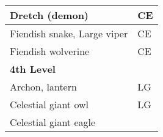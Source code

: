 \begin{longtable}{llll}
\multicolumn{1}{|p{3.326in}|}{\begin{minipage}[t]{3.326in}\raggedright
Dretch (demon)\end{minipage}} & \multicolumn{3}{p{0.601in}|}{\begin{minipage}[t]{0.601in}\raggedright
CE\end{minipage}}\\
\hline
\multicolumn{1}{|p{3.326in}|}{\begin{minipage}[t]{3.326in}\raggedright
Fiendish snake, Large viper\end{minipage}} & \multicolumn{3}{p{0.601in}|}{\begin{minipage}[t]{0.601in}\raggedright
CE\end{minipage}}\\
\hline
\multicolumn{1}{|p{3.326in}|}{\begin{minipage}[t]{3.326in}\raggedright
Fiendish wolverine\end{minipage}} & \multicolumn{3}{p{0.601in}|}{\begin{minipage}[t]{0.601in}\raggedright
CE\end{minipage}}\\
\hline
\multicolumn{1}{|p{3.326in}|}{\begin{minipage}[t]{3.326in}\raggedright
\textbf{4th Level}\end{minipage}} & \multicolumn{3}{p{0.601in}|}{\begin{minipage}[t]{0.601in}\raggedright
\end{minipage}}\\
\hline
\multicolumn{1}{|p{3.326in}|}{\begin{minipage}[t]{3.326in}\raggedright
Archon, lantern\end{minipage}} & \multicolumn{3}{p{0.601in}|}{\begin{minipage}[t]{0.601in}\raggedright
LG\end{minipage}}\\
\hline
\multicolumn{1}{|p{3.326in}|}{\begin{minipage}[t]{3.326in}\raggedright
Celestial giant owl\end{minipage}} & \multicolumn{3}{p{0.601in}|}{\begin{minipage}[t]{0.601in}\raggedright
LG\end{minipage}}\\
\hline
\multicolumn{1}{|p{3.326in}|}{\begin{minipage}[t]{3.326in}\raggedright
Celestial giant eagle\end{minipage}} & \multicolumn{3}{p{0.601in}|}{\begin{minipage}[t]{0.601in}\raggedright

\end{minipage}}
\end{longtable}
